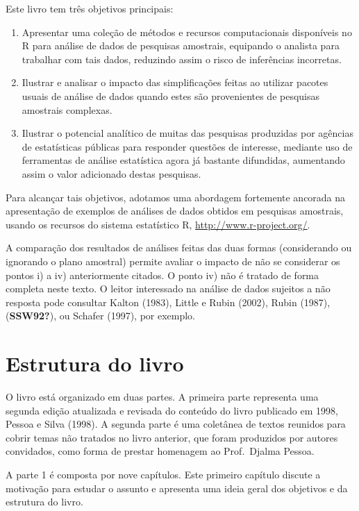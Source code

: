 \documentclass[
  12pt,
  brazilian,
]{book}
\theoremstyle{definition}
\theoremstyle{definition}
\theoremstyle{definition}
\theoremstyle{definition}
\theoremstyle{remark}
\begin{document}
Este livro tem três objetivos principais:

\begin{enumerate}
\def\labelenumi{\arabic{enumi})}
\item
  Apresentar uma coleção de métodos e recursos computacionais disponíveis no R para análise de dados de pesquisas amostrais, equipando o analista para trabalhar com tais dados, reduzindo assim o risco de inferências incorretas.
\item
  Ilustrar e analisar o impacto das simplificações feitas ao utilizar pacotes usuais de análise de dados quando estes são provenientes de pesquisas amostrais complexas.
\item
  Ilustrar o potencial analítico de muitas das pesquisas produzidas por agências de estatísticas públicas para responder questões de interesse, mediante uso de ferramentas de análise estatística agora já bastante difundidas, aumentando assim o valor adicionado destas pesquisas.
\end{enumerate}

Para alcançar tais objetivos, adotamos uma abordagem fortemente ancorada na
apresentação de exemplos de análises de dados obtidos em pesquisas amostrais, usando os recursos do sistema estatístico R, \url{http://www.r-project.org/}.

A comparação dos resultados de análises feitas das duas formas (considerando ou
ignorando o plano amostral) permite avaliar o impacto de não se considerar os pontos i) a iv) anteriormente citados. O ponto iv) não é tratado de forma completa neste texto. O leitor interessado na análise de dados sujeitos a não resposta pode consultar Kalton (1983), Little e Rubin (2002), Rubin (1987), (\textbf{SSW92?}), ou Schafer (1997), por exemplo.

\hypertarget{estrutura-do-livro}{%
\section{Estrutura do livro}\label{estrutura-do-livro}}

O livro está organizado em duas partes. A primeira parte representa uma segunda edição atualizada e revisada do conteúdo do livro publicado em 1998, Pessoa e Silva (1998). A segunda parte é uma coletânea de textos reunidos para cobrir temas não tratados no livro anterior, que foram produzidos por autores convidados, como forma de prestar homenagem ao Prof.~Djalma Pessoa.

A parte 1 é composta por nove capítulos. Este primeiro capítulo discute a motivação para estudar o assunto e apresenta uma ideia geral dos objetivos e da estrutura do livro.
\end{document}
